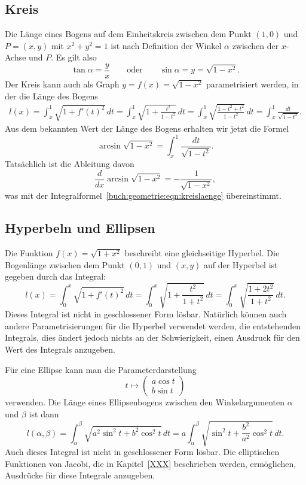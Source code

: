 \subsection{Kreis}
Die Länge eines Bogens auf dem Einheitskreis zwischen dem Punkt
$(1,0)$ und $P=(x,y)$ mit $x^2+y^2=1$ ist nach Definition der
Winkel $\alpha$ zwischen der $x$-Achse und $P$.
Es gilt also
\[
\tan\alpha = \frac{y}{x}
\qquad\text{oder}\qquad
\sin\alpha = y = \sqrt{1-x^2}.
\]
Der Kreis kann auch als Graph $y=f(x)=\sqrt{1-x^2}$ parametrisiert werden,
in der die Länge des Bogens 
\begin{align*}
l(x)
=
\int_x^1 \sqrt{1+f'(t)^2}\,dt
=
\int_x^1 \sqrt{1+\frac{t^2}{1-t^2}}\,dt
=
\int_x^1 \sqrt{\frac{1-t^2+t^2}{1-t^2}}\,dt
=
\int_x^1 \frac{dt}{\sqrt{1-t^2}}.
\end{align*}
Aus dem bekannten Wert der Länge des Bogens erhalten wir jetzt die
Formel
\begin{equation}
\arcsin \sqrt{1-x^2} = \int_x^1 \frac{dt}{\sqrt{1-t^2}}.
\label{buch:geometrie:eqn:kreislaenge} 
\end{equation}
Tatsächlich ist die Ableitung davon
\[
\frac{d}{dx}\arcsin\sqrt{1-x^2}
=
-\frac{1}{\sqrt{1-x^2}},
\]
was mit der Integralformel~\ref{buch:geometrie:eqn:kreislaenge} 
übereinstimmt.

\subsection{Hyperbeln und Ellipsen
\label{buch:geometrie:subsection:hyperbeln-und-ellipsen}}
Die Funktion $f(x)=\sqrt{1+x^2}$ beschreibt eine gleichseitige
Hyperbel.
Die Bogenlänge zwischen dem Punkt $(0,1)$ und $(x,y)$ auf der
Hyperbel ist gegeben durch das Integral:
\[
l(x)
=
\int_0^x \sqrt{1+f'(t)^2}\,dt
=
\int_0^x \sqrt{1+\frac{t^2}{1+t^2}}\,dt
=
\int_0^x \sqrt{\frac{1+2t^2}{1+t^2}}\,dt.
\]
Dieses Integral ist nicht in geschlossener Form lösbar.
Natürlich können auch andere Parametrisierungen für die Hyperbel
verwendet werden, die entstehenden Integrals, dies ändert jedoch
nichts an der Schwierigkeit, einen Ausdruck für den Wert des
Integrals anzugeben.

Für eine Ellipse kann man die Parameterdarstellung 
\[
t\mapsto \begin{pmatrix}a\cos t\\b\sin t\end{pmatrix}
\]
verwenden.
Die Länge eines Ellipsenbogens zwischen den Winkelargumenten $\alpha$ und
$\beta$ ist dann
\[
l(\alpha,\beta)
=
\int_\alpha^\beta
\sqrt{
a^2 \sin^2 t + b^2 \cos^2t
}
\,dt
=
a
\int_\alpha^\beta
\sqrt{
\sin^2 t + \frac{b^2}{a^2} \cos^2t
}
\,dt.
\]
Auch dieses Integral ist nicht in geschlossener Form lösbar.
Die elliptischen Funktionen von Jacobi, die in Kapitel~\ref{XXX}
beschrieben werden, ermöglichen, Ausdrücke für diese Integrale
anzugeben.




